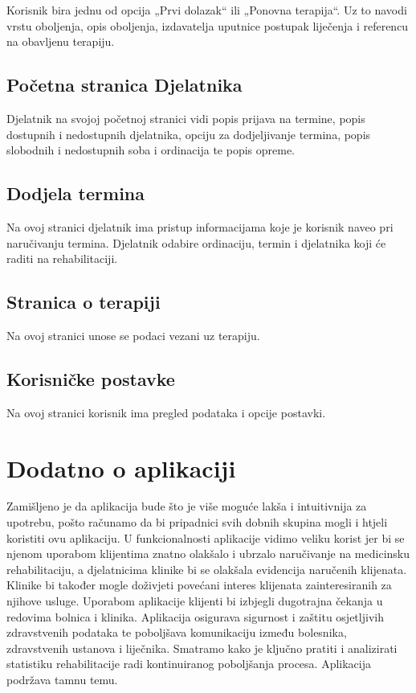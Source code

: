 Korisnik bira jednu od opcija „Prvi dolazak“ ili „Ponovna terapija“. Uz to navodi vrstu oboljenja, opis oboljenja, izdavatelja uputnice postupak liječenja i referencu na obavljenu terapiju.

\subsection{Početna stranica Djelatnika}

Djelatnik na svojoj početnoj stranici vidi popis prijava na termine, popis dostupnih i nedostupnih djelatnika, opciju za dodjeljivanje termina, popis slobodnih i nedostupnih soba i ordinacija te popis opreme.

\subsection{Dodjela termina}

Na ovoj stranici djelatnik ima pristup informacijama koje je korisnik naveo pri naručivanju termina. Djelatnik odabire ordinaciju, termin i djelatnika koji će raditi na rehabilitaciji.

\subsection{Stranica o terapiji}

Na ovoj stranici unose se podaci vezani uz terapiju.

\subsection{Korisničke postavke}

Na ovoj stranici korisnik ima pregled podataka i opcije postavki.

\section{Dodatno o aplikaciji}

Zamišljeno je da aplikacija bude što je više moguće lakša i intuitivnija za upotrebu, pošto računamo da bi pripadnici svih dobnih skupina mogli i htjeli koristiti ovu aplikaciju. U funkcionalnosti aplikacije vidimo veliku korist jer bi se njenom uporabom klijentima  znatno olakšalo i ubrzalo naručivanje na medicinsku rehabilitaciju, a djelatnicima klinike bi se olakšala evidencija naručenih klijenata. Klinike bi također mogle doživjeti povećani interes klijenata zainteresiranih za njihove usluge. Uporabom aplikacije klijenti bi izbjegli dugotrajna čekanja u redovima bolnica i klinika. Aplikacija osigurava sigurnost i zaštitu osjetljivih zdravstvenih podataka te poboljšava komunikaciju između bolesnika, zdravstvenih ustanova i liječnika. Smatramo kako je ključno pratiti i analizirati statistiku rehabilitacije radi kontinuiranog poboljšanja procesa. Aplikacija podržava tamnu temu.

